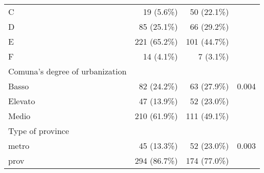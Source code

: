 \begin{table}[ht]
\begin{tabular}{llll}
\multicolumn{1}{l}{\hspace{1em}C} &
  \multicolumn{1}{r}{19 (5.6\%)} &
  \multicolumn{1}{r}{50 (22.1\%)} &
  \multicolumn{1}{r}{} \\
\multicolumn{1}{l}{\hspace{1em}D} &
  \multicolumn{1}{r}{85 (25.1\%)} &
  \multicolumn{1}{r}{66 (29.2\%)} &
  \multicolumn{1}{r}{} \\
\multicolumn{1}{l}{\hspace{1em}E} &
  \multicolumn{1}{r}{221 (65.2\%)} &
  \multicolumn{1}{r}{101 (44.7\%)} &
  \multicolumn{1}{r}{} \\
\multicolumn{1}{l}{\hspace{1em}F} &
  \multicolumn{1}{r}{14 (4.1\%)} &
  \multicolumn{1}{r}{7 (3.1\%)} &
  \multicolumn{1}{r}{} \\
\multicolumn{1}{l}{Comuna's degree of urbanization} &
  \multicolumn{1}{r}{} &
  \multicolumn{1}{r}{} &
  \multicolumn{1}{r}{} \\
\multicolumn{1}{l}{\hspace{1em}Basso} &
  \multicolumn{1}{r}{82 (24.2\%)} &
  \multicolumn{1}{r}{63 (27.9\%)} &
  \multicolumn{1}{r}{0.004} \\
\multicolumn{1}{l}{\hspace{1em}Elevato} &
  \multicolumn{1}{r}{47 (13.9\%)} &
  \multicolumn{1}{r}{52 (23.0\%)} &
  \multicolumn{1}{r}{} \\
\multicolumn{1}{l}{\hspace{1em}Medio} &
  \multicolumn{1}{r}{210 (61.9\%)} &
  \multicolumn{1}{r}{111 (49.1\%)} &
  \multicolumn{1}{r}{} \\
\multicolumn{1}{l}{Type of province} &
  \multicolumn{1}{r}{} &
  \multicolumn{1}{r}{} &
  \multicolumn{1}{r}{} \\
\multicolumn{1}{l}{\hspace{1em}metro} &
  \multicolumn{1}{r}{45 (13.3\%)} &
  \multicolumn{1}{r}{52 (23.0\%)} &
  \multicolumn{1}{r}{0.003} \\
\multicolumn{1}{l}{\hspace{1em}prov} &
  \multicolumn{1}{r}{294 (86.7\%)} &
  \multicolumn{1}{r}{174 (77.0\%)} &
  \multicolumn{1}{r}{} \\
\cline{1-4}
\end{tabular}
\end{table}
